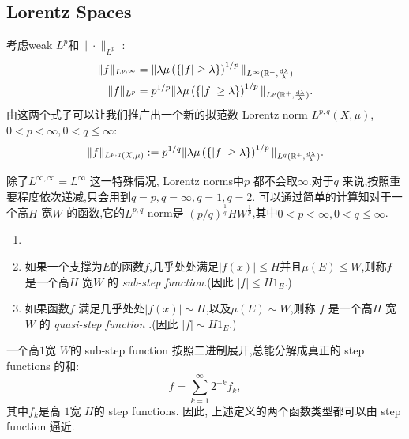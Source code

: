 \subsection{Lorentz Spaces}
考虑weak $L^{p}$和$\|\cdot \|_{L^{p}}$ :
\begin{equation*}
  \begin{aligned}
    \|f\|_{L^{p,\infty}} & = \|\lambda \mu\left( \left\{ |f|\ge \lambda \right\}  \right) ^{1 /p}\|_{L^{\infty}(\mathbb{R}^{+},\frac{\mathrm{d}\lambda}{\lambda})}\\
    \|f\|_{L^{p}} & = p^{1 /p}\|\lambda\mu\left( \left\{ |f|\ge \lambda \right\}  \right) ^{1 /p}\|_{L^{p}(\mathbb{R}^{+}, \frac{\mathrm{d}\lambda}{\lambda})}.
  \end{aligned}
\end{equation*}
由这两个式子可以让我们推广出一个新的拟范数 Lorentz norm $L^{p,q}(X,\mu)$,$0<p<\infty,0<q\le \infty$:
\[
  \|f\|_{L^{p,q}(X,\mu)}:=p^{1 /q}\|\lambda \mu\left( \left\{ |f|\ge \lambda \right\}  \right) ^{1 /p}\|_{L^{q}(\mathbb{R}^{+}, \frac{\mathrm{d}\lambda}{\lambda})}.
\]

除了$L^{\infty,\infty}=L^{\infty}$ 这一特殊情况, Lorentz norms中$p$ 都不会取$\infty$.对于$q$ 来说,按照重要程度依次递减,只会用到$q=p,q=\infty,q=1,q=2$.
可以通过简单的计算知对于一个高$H$ 宽$W$ 的函数,它的$L^{p,q}$ norm是 $(p /q)^{\frac{1}{q}}HW^{\frac{1}{p}}$,其中$0<p<\infty,0<q\le \infty$.

\begin{definition}
  \begin{enumerate}
    \item []
    \item  如果一个支撑为$E$的函数$f$,几乎处处满足$|f(x)|\le H$并且$\mu(E)\le W$,则称$f$ 是一个高$H$ 宽$W$ 的\textit{ sub-step function}.(因此 $|f|\le H 1_{E}$.)
    \item 如果函数$f$ 满足几乎处处$|f(x)|\sim H$,以及$\mu(E)\sim W$,则称 $f$ 是一个高$H$ 宽$W$ 的 \textit{quasi-step function} .(因此 $|f|\sim H 1_E$.)
  \end{enumerate}
\end{definition}

\begin{remark}\label{rmk1-1}
一个高$1$宽 $W$的 sub-step function 按照二进制展开,总能分解成真正的 step functions 的和:
\[
f=\sum_{k=1}^{\infty} 2^{-k}f_k,
\] 
其中$f_k$是高 $1$宽 $H$的 step functions.
因此, 上述定义的两个函数类型都可以由 step function 逼近.
\end{remark}


